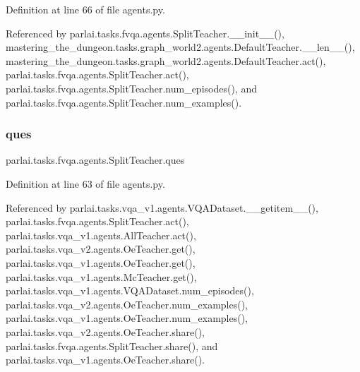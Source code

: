 Definition at line 66 of file agents.\+py.



Referenced by parlai.\+tasks.\+fvqa.\+agents.\+Split\+Teacher.\+\_\+\+\_\+init\+\_\+\+\_\+(), mastering\+\_\+the\+\_\+dungeon.\+tasks.\+graph\+\_\+world2.\+agents.\+Default\+Teacher.\+\_\+\+\_\+len\+\_\+\+\_\+(), mastering\+\_\+the\+\_\+dungeon.\+tasks.\+graph\+\_\+world2.\+agents.\+Default\+Teacher.\+act(), parlai.\+tasks.\+fvqa.\+agents.\+Split\+Teacher.\+act(), parlai.\+tasks.\+fvqa.\+agents.\+Split\+Teacher.\+num\+\_\+episodes(), and parlai.\+tasks.\+fvqa.\+agents.\+Split\+Teacher.\+num\+\_\+examples().

\mbox{\label{classparlai_1_1tasks_1_1fvqa_1_1agents_1_1SplitTeacher_a0b5fea9e97b0a1d4cf63097f2efcf8da}} 
\subsubsection{\texorpdfstring{ques}{ques}}
{\footnotesize\ttfamily parlai.\+tasks.\+fvqa.\+agents.\+Split\+Teacher.\+ques}



Definition at line 63 of file agents.\+py.



Referenced by parlai.\+tasks.\+vqa\+\_\+v1.\+agents.\+V\+Q\+A\+Dataset.\+\_\+\+\_\+getitem\+\_\+\+\_\+(), parlai.\+tasks.\+fvqa.\+agents.\+Split\+Teacher.\+act(), parlai.\+tasks.\+vqa\+\_\+v1.\+agents.\+All\+Teacher.\+act(), parlai.\+tasks.\+vqa\+\_\+v2.\+agents.\+Oe\+Teacher.\+get(), parlai.\+tasks.\+vqa\+\_\+v1.\+agents.\+Oe\+Teacher.\+get(), parlai.\+tasks.\+vqa\+\_\+v1.\+agents.\+Mc\+Teacher.\+get(), parlai.\+tasks.\+vqa\+\_\+v1.\+agents.\+V\+Q\+A\+Dataset.\+num\+\_\+episodes(), parlai.\+tasks.\+vqa\+\_\+v2.\+agents.\+Oe\+Teacher.\+num\+\_\+examples(), parlai.\+tasks.\+vqa\+\_\+v1.\+agents.\+Oe\+Teacher.\+num\+\_\+examples(), parlai.\+tasks.\+vqa\+\_\+v2.\+agents.\+Oe\+Teacher.\+share(), parlai.\+tasks.\+fvqa.\+agents.\+Split\+Teacher.\+share(), and parlai.\+tasks.\+vqa\+\_\+v1.\+agents.\+Oe\+Teacher.\+share().

\mbox{\label{classparlai_1_1tasks_1_1fvqa_1_1agents_1_1SplitTeacher_a6d0dd7e2e4ba732905587ef8be1b3613}} 
